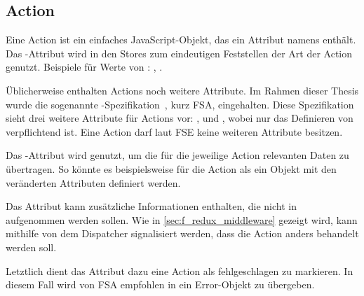\subsection{Action}
\label{ssec:gf_action}

Eine Action ist ein einfaches JavaScript-Objekt, das ein Attribut namens
 enthält.  Das -Attribut wird in den Stores zum
eindeutigen Feststellen der Art der Action genutzt.  Beispiele für Werte von
:  , .

Üblicherweise enthalten Actions noch weitere Attribute.  Im Rahmen dieser Thesis
wurde die sogenannte
-Spezifikation~\cite{fsa}, kurz FSA,
eingehalten.  Diese Spezifikation sieht drei weitere Attribute für Actions vor:
,  und , wobei nur das Definieren von
 verpflichtend ist.  Eine Action darf laut FSE keine weiteren
Attribute besitzen.

Das -Attribut wird genutzt, um die für die jeweilige Action
relevanten Daten zu übertragen.  So könnte es beispielsweise für die Action
 als ein Objekt mit den veränderten Attributen definiert
werden.

Das Attribut  kann zusätzliche Informationen enthalten, die nicht in
 aufgenommen werden sollen.  Wie in \cref{sec:f_redux_middleware}
gezeigt wird, kann mithilfe von  dem Dispatcher signalisiert werden,
dass die Action anders behandelt werden soll.

Letztlich dient das  Attribut dazu eine Action als fehlgeschlagen zu
markieren.  In diesem Fall wird von FSA empfohlen in  ein
Error-Objekt zu übergeben.
